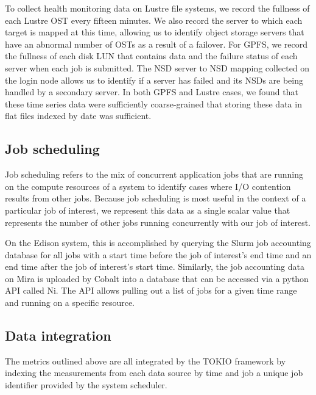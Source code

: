 To collect health monitoring data on Lustre file systems, we record the fullness of each Lustre OST every fifteen minutes.
We also record the server to which each target is mapped at this time, allowing us to identify object storage servers that have an abnormal number of OSTs as a result of a failover.
For GPFS, we record the fullness of each disk LUN that contains data and the failure status of each server when each job is submitted.
The NSD server to NSD mapping collected on the login node allows us to identify if a server has failed and its NSDs are being handled by a secondary server.
In both GPFS and Lustre cases, we found that these time series data were sufficiently coarse-grained that storing these data in flat files indexed by date was sufficient.

\subsection{Job scheduling}

Job scheduling refers to the mix of concurrent application jobs that are running on the compute resources of a system to identify cases where I/O contention results from other jobs.
Because job scheduling is most useful in the context of a particular job of interest, we represent this data as a single scalar value that represents the number of other jobs running concurrently with our job of interest.

On the Edison system, this is accomplished by querying the Slurm job accounting database for all jobs with a start time before the job of interest's end time and an end time after the job of interest's start time.
Similarly, the job accounting data on Mira is uploaded by Cobalt into a database that can be accessed via a python API called Ni.
The API allows pulling out a list of jobs for a given time range and running on a specific resource.

\subsection{Data integration} \label{sec:data-integration}

The metrics outlined above are all integrated by the TOKIO framework by indexing the measurements from each data source by time and job a unique job identifier provided by the system scheduler.

